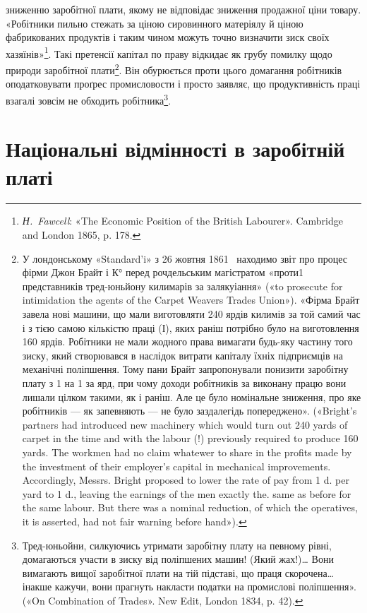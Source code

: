 зниженню заробітної плати, якому не відповідає зниження продажної
ціни товару. «Робітники пильно стежать за ціною сировинного
матеріялу й ціною фабрикованих продуктів і таким чином
можуть точно визначити зиск своїх хазяїнів»\footnote{
\emph{Н.~Fawcell}: «The Economic Position of the British Labourer».
Cambridge and London 1865, p. 178.
}. Такі претенсії
капітал по праву відкидає як грубу помилку щодо природи
заробітної плати\footnote{
У лондонському «Standard’i» з 26 жовтня 1861~ находимо звіт
про процес фірми Джон Брайт і К° перед рочдельським магістратом
«проти1 представників тред-юньйону килимарів за залякуіання»
(«to prosecute for intimidation the agents of the Carpet Weavers Trades
Union»). «Фірма Брайт завела нові машини, що мали виготовляти 240 ярдів
килимів за той самий час і з тією самою кількістю праці (І), яких
раніш потрібно було на виготовлення 160 ярдів. Робітники не мали жодного
права вимагати будь-яку частину того зиску, який створювався в наслідок
витрати капіталу їхніх підприємців на механічні поліпшення. Тому
пани Брайт запропонували понизити заробітну плату з 1 на
1 за ярд, при чому доходи робітників за виконану працю вони лишали
цілком такими, як і раніш. Але це було номінальне зниження, про яке
робітників — як запевняють — не було заздалегідь попереджено». («Bright’s
partners had introduced new machinery which would turn out 240 yards
of carpet in the time and with the labour (!) previously required to produce
160 yards. The workmen had no claim whatewer to share in the profits
made by the investment of their employer’s capital in mechanical improvements.
Accordingly, Messrs. Bright proposed to lower the rate of pay from
1 d. per yard to 1 d., leaving the earnings of the men exactly the. same
as before for the same labour. But there was a nominal reduction, of which
the operatives, it is asserted, had not fair warning before hand»).
}. Він обурюється проти цього домагання робітників
оподатковувати проґрес промисловости і просто заявляє,
що продуктивність праці взагалі зовсім не обходить робітника\footnote{
Тред-юньойни, силкуючись утримати заробітну плату на певному
рівні, домагаються участи в зиску від поліпшених машин! (Який
жах!)\dots{} Вони вимагають вищої заробітної плати на тій підставі, що праця
скорочена\dots{} інакше кажучи, вони прагнуть накласти податки на промислові
поліпшення». («On Combination of Trades». New Edit, London
1834, p. 42).
}.

\section{Національні відмінності в заробітній платі}

